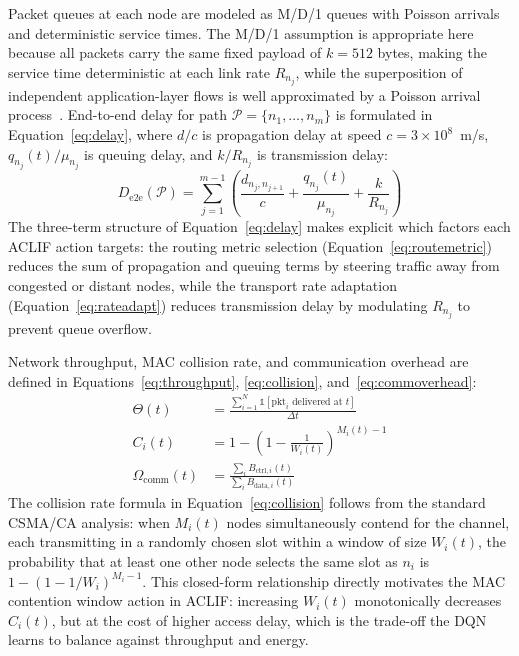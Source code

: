 \documentclass[a4paper]{cas-dc}
\numberwithin{equation}{section}
\begin{document}
Packet queues at each node are modeled as M/D/1 queues with Poisson arrivals and deterministic service times. The M/D/1 assumption is appropriate here because all packets carry the same fixed payload of $k = 512$ bytes, making the service time deterministic at each link rate $R_{n_j}$, while the superposition of independent application-layer flows is well approximated by a Poisson arrival process~\cite{Resner201824}. End-to-end delay for path $\mathcal{P}=\{n_1,\ldots,n_m\}$ is formulated in Equation~\ref{eq:delay}, where $d/c$ is propagation delay at speed $c=3\times10^8$~m/s, $q_{n_j}(t)/\mu_{n_j}$ is queuing delay, and $k/R_{n_j}$ is transmission delay:
\begin{equation}
\label{eq:delay}
D_{\text{e2e}}(\mathcal{P}) = \sum_{j=1}^{m-1}\!\left(\frac{d_{n_j,n_{j+1}}}{c} + \frac{q_{n_j}(t)}{\mu_{n_j}} + \frac{k}{R_{n_j}}\right)
\end{equation}
The three-term structure of Equation~\ref{eq:delay} makes explicit which factors each ACLIF action targets: the routing metric selection (Equation~\ref{eq:routemetric}) reduces the sum of propagation and queuing terms by steering traffic away from congested or distant nodes, while the transport rate adaptation (Equation~\ref{eq:rateadapt}) reduces transmission delay by modulating $R_{n_j}$ to prevent queue overflow.

Network throughput, MAC collision rate, and communication overhead are defined in Equations~\ref{eq:throughput}, \ref{eq:collision}, and~\ref{eq:commoverhead}:
\begin{align}
\label{eq:throughput}
\Theta(t)              &= \frac{\displaystyle\sum_{i=1}^{N}\mathbb{1}[\text{pkt}_i\text{ delivered at }t]}{\Delta t} \\[6pt]
\label{eq:collision}
C_i(t)                &= 1-\!\left(1-\frac{1}{W_i(t)}\right)^{\!M_i(t)-1} \\[4pt]
\label{eq:commoverhead}
\Omega_{\text{comm}}(t) &= \frac{\displaystyle\sum_i B_{\text{ctrl},i}(t)}{\displaystyle\sum_i B_{\text{data},i}(t)}
\end{align}
The collision rate formula in Equation~\ref{eq:collision} follows from the standard CSMA/CA analysis: when $M_i(t)$ nodes simultaneously contend for the channel, each transmitting in a randomly chosen slot within a window of size $W_i(t)$, the probability that at least one other node selects the same slot as $n_i$ is $1-(1-1/W_i)^{M_i-1}$. This closed-form relationship directly motivates the MAC contention window action in ACLIF: increasing $W_i(t)$ monotonically decreases $C_i(t)$, but at the cost of higher access delay, which is the trade-off the DQN learns to balance against throughput and energy.
\end{document}
